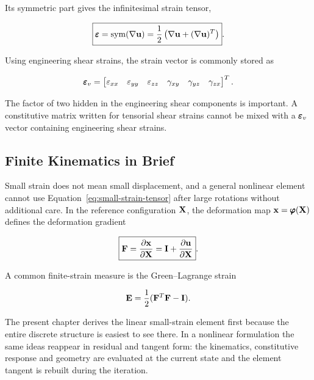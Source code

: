 Its symmetric part gives the infinitesimal strain tensor,

\begin{equation}\label{eq:small-strain-tensor}
    \boxed{
    \pmb{\varepsilon}
    =\operatorname{sym}(\nabla\mathbf{u})
    =\frac{1}{2}
    \left(
        \nabla\mathbf{u}+(\nabla\mathbf{u})^T
    \right)}.
\end{equation}

Using engineering shear strains, the strain vector is commonly stored as

\begin{equation}\label{eq:engineering-strain-vector}
    \pmb{\varepsilon}_v
    =
    \begin{bmatrix}
        \varepsilon_{xx}&
        \varepsilon_{yy}&
        \varepsilon_{zz}&
        \gamma_{xy}&
        \gamma_{yz}&
        \gamma_{zx}
    \end{bmatrix}^T.
\end{equation}

The factor of two hidden in the engineering shear components is important. A
constitutive matrix written for tensorial shear strains cannot be mixed with a
$\pmb{\varepsilon}_v$ vector containing engineering shear strains.

\subsection{Finite Kinematics in Brief}

Small strain does not mean small displacement, and a general nonlinear element
cannot use Equation~\eqref{eq:small-strain-tensor} after large rotations without
additional care. In the reference configuration $\mathbf{X}$, the deformation map
$\mathbf{x}=\pmb{\varphi}(\mathbf{X})$ defines the deformation gradient

\begin{equation}
    \boxed{
    \mathbf{F}=\frac{\partial\mathbf{x}}{\partial\mathbf{X}}
    =\mathbf{I}+\frac{\partial\mathbf{u}}{\partial\mathbf{X}}
    }.
\end{equation}

A common finite-strain measure is the Green--Lagrange strain

\begin{equation}
    \mathbf{E}
    =\frac{1}{2}(\mathbf{F}^T\mathbf{F}-\mathbf{I}).
\end{equation}

The present chapter derives the linear small-strain element first because the
entire discrete structure is easiest to see there. In a nonlinear formulation
the same ideas reappear in residual and tangent form: the kinematics,
constitutive response and geometry are evaluated at the current state and the
element tangent is rebuilt during the iteration.

